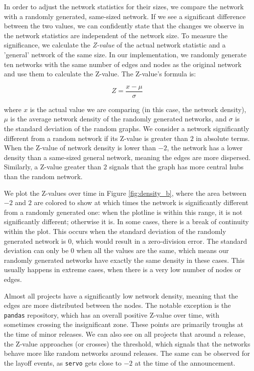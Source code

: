 In order to adjust the network statistics for their sizes, we compare the network with a randomly generated, same-sized network. If we see a significant difference between the two values, we can confidently state that the changes we observe in the network statistics are independent of the network size. To measure the significance, we calculate the \textit{Z-value} of the actual network statistic and a 'general' network of the same size. In our implementation, we randomly generate ten networks with the same number of edges and nodes as the original network and use them to calculate the Z-value. The Z-value's formula is:

\[ Z=\frac{x-\mu}{\sigma} \]

where $x$ is the actual value we are comparing (in this case, the network density), $\mu$ is the average network density of the randomly generated networks, and $\sigma$ is the standard deviation of the random graphs. We consider a network significantly different from a random network if its Z-value is greater than $2$ in absolute terms. When the Z-value of network density is lower than $-2$, the network has a lower density than a same-sized general network, meaning the edges are more dispersed. Similarly, a Z-value greater than $2$ signals that the graph has more central hubs than the random network.

We plot the Z-values over time in Figure \ref{fig:density_b}, where the area between $-2$ and $2$ are colored to show at which times the network is significantly different from a randomly generated one: when the plotline is within this range, it is not significantly different; otherwise it is. In some cases, there is a break of continuity within the plot. This occurs when the standard deviation of the randomly generated network is $0$, which would result in a zero-division error. The standard deviation can only be $0$ when all the values are the same, which means our randomly generated networks have exactly the same density in these cases. This usually happens in extreme cases, when there is a very low number of nodes or edges.
  
Almost all projects have a significantly low network density, meaning that the edges are more distributed between the nodes. The notable exception is the \texttt{pandas} repository, which has an overall positive Z-value over time, with sometimes crossing the insignificant zone. These points are primarily troughs at the time of minor releases. We can also see on all projects that around a release, the Z-value approaches (or crosses) the threshold, which signals that the networks behave more like random networks around releases. The same can be observed for the layoff events, as \texttt{servo} gets close to $-2$ at the time of the announcement.

